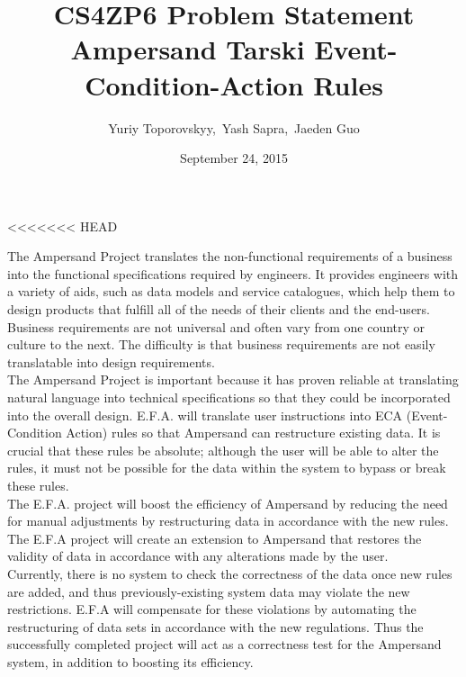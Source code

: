 \documentclass[12pt]{article}
\begin{document}
\title{CS4ZP6 Problem Statement \\ Ampersand Tarski Event-Condition-Action Rules } 
\author{Yuriy Toporovskyy,\ Yash Sapra,\ Jaeden Guo}
<<<<<<< HEAD
\date{September 24, 2015}
\thispagestyle{empty}
\maketitle

\indent The Ampersand Project translates the non-functional requirements of a 
business into the functional specifications required by engineers. It provides 
engineers with a variety of aids, such as data models and service catalogues, 
which help them to design products that fulfill all of the needs of their 
clients and the end-users. Business requirements are not universal and often 
vary from one country or culture to the next. The difficulty is that business 
requirements are not easily translatable into design requirements.\\
\indent The Ampersand Project is important because it has proven reliable at 
translating natural language into technical specifications so that they could 
be incorporated into the overall design. E.F.A. will translate user 
instructions into ECA (Event-Condition Action) rules so that Ampersand can 
restructure existing data. It is crucial that these rules be absolute; although 
the user will be able to alter the rules, it must not be possible for the data 
within the system to bypass or break these rules. \\
\indent The E.F.A. project will boost the efficiency of Ampersand by reducing 
the need for manual adjustments by restructuring data in accordance with the 
new rules. The E.F.A project will create an extension to Ampersand that 
restores the validity of data in accordance with any alterations made by the 
user. \\ 
\indent Currently, there is no system to check the correctness of the data 
once new rules are added, and thus previously-existing system data may violate the 
new restrictions. E.F.A will compensate for these violations by automating the 
restructuring of data sets in accordance with the new regulations. Thus the 
successfully completed project will act as a correctness test for the Ampersand 
system, in addition to boosting its efficiency. 
\end{document}

